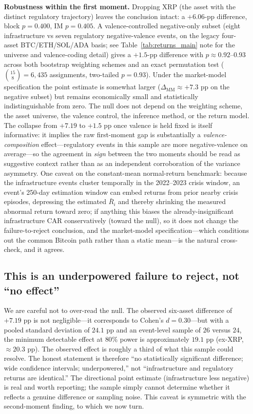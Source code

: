 \documentclass[pdflatex,sn-mathphys-num]{sn-jnl}
\theoremstyle{thmstyleone}
\theoremstyle{thmstyletwo}
\theoremstyle{thmstylethree}
\begin{document}
\textbf{Robustness within the first moment.} Dropping XRP (the asset with the distinct regulatory trajectory) leaves the conclusion intact: a $+6.06$-pp difference, block $p=0.400$, IM $p=0.405$. A valence-controlled negative-only subset (eight infrastructure vs seven regulatory negative-valence events, on the legacy four-asset BTC/ETH/SOL/ADA basis; see Table~\ref{tab:returns_main} note for the universe and valence-coding detail) gives a $+1.5$-pp difference with $p\approx 0.92$--$0.93$ across both bootstrap weighting schemes and an exact permutation test ($\binom{15}{8}=6{,}435$ assignments, two-tailed $p=0.93$). Under the market-model specification the point estimate is somewhat larger ($\Delta_{\text{MM}} \approx +7.3$ pp on the negative subset) but remains economically small and statistically indistinguishable from zero. The null does not depend on the weighting scheme, the asset universe, the valence control, the inference method, or the return model. The collapse from $+7.19$ to $+1.5$ pp once valence is held fixed is itself informative: it implies the raw first-moment gap is substantially a \emph{valence-composition} effect---regulatory events in this sample are more negative-valence on average---so the agreement in \emph{sign} between the two moments should be read as suggestive context rather than as an independent corroboration of the variance asymmetry. One caveat on the constant-mean normal-return benchmark: because the infrastructure events cluster temporally in the 2022--2023 crisis window, an event's 250-day estimation window can embed returns from prior nearby crisis episodes, depressing the estimated $\bar R_i$ and thereby shrinking the measured abnormal return toward zero; if anything this biases the already-insignificant infrastructure CAR conservatively (toward the null), so it does not change the failure-to-reject conclusion, and the market-model specification---which conditions out the common Bitcoin path rather than a static mean---is the natural cross-check, and it agrees.

\subsection{This is an underpowered failure to reject, not ``no effect''}

We are careful not to over-read the null. The observed six-asset difference of $+7.19$ pp is not negligible---it corresponds to Cohen's $d=0.30$---but with a pooled standard deviation of $24.1$ pp and an event-level sample of $26$ versus $24$, the minimum detectable effect at $80\%$ power is approximately $19.1$ pp (ex-XRP, $\approx 20.3$ pp). The observed effect is roughly a third of what this sample could resolve. The honest statement is therefore ``no statistically significant difference; wide confidence intervals; underpowered,'' not ``infrastructure and regulatory returns are identical.'' The directional point estimate (infrastructure less negative) is real and worth reporting; the sample simply cannot determine whether it reflects a genuine difference or sampling noise. This caveat is symmetric with the second-moment finding, to which we now turn.
\end{document}
